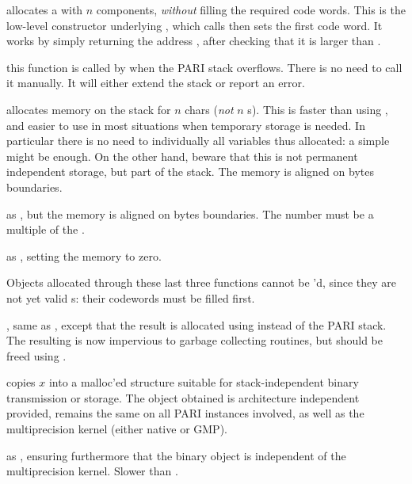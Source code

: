  allocates a  with $n$ components,
\emph{without} filling the required code words. This is the low-level
constructor underlying , which calls  then sets
the first code word. It works by simply returning the address
, after checking that it is larger than .

 this function is called by
 when the PARI stack overflows. There is no need to call it
manually. It will either extend the stack or report an  error.

 allocates memory on the stack for $n$
chars (\emph{not} $n$ s). This is faster than using ,
and easier to use in most situations when temporary storage is needed. In
particular there is no need to  individually all variables thus
allocated: a simple  might be enough. On the other hand,
beware that this is not permanent independent storage, but part of the stack.
The memory is aligned on  bytes boundaries.

 as ,
but the memory is aligned on  bytes boundaries. The number must
be a multiple of the .

 as , setting the memory
to zero.

\noindent Objects allocated through these last three functions cannot be
'd, since they are not yet valid s: their codewords
must be filled first.

, same as , except
that the result is allocated using  instead of the PARI
stack. The resulting  is now impervious to garbage collecting
routines, but should be freed using .


 copies $x$ into a malloc'ed structure suitable
for stack-independent binary transmission or storage. The object obtained
is architecture independent provided,  remains the same
on all PARI instances involved, as well as the multiprecision kernel (either
native or GMP).

 as , ensuring furthermore
that the binary object is independent of the multiprecision kernel. Slower
than .


